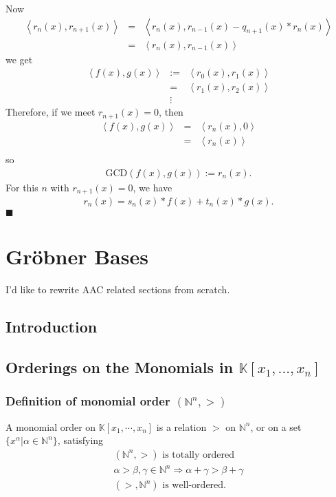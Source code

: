 \documentclass[11pt]{book}
\begin{document}
Now
\begin{eqnarray}
\left< r_n(x), r_{n+1}(x) \right>
&=& \left< r_n(x), r_{n-1}(x) - q_{n+1}(x) * r_n(x) \right> \\
&=& \left< r_n(x), r_{n-1}(x) \right>
\end{eqnarray}
we get
\begin{eqnarray}
\left< f(x), g(x) \right> &:=& \left< r_0(x), r_1(x) \right> \\
&=& \left< r_1(x), r_2(x) \right> \\
\nonumber &\vdots& 
\end{eqnarray}
Therefore, if we meet $r_{n+1}(x) = 0$, then
\begin{eqnarray}
\left< f(x), g(x) \right>  &=& \left< r_n(x), 0 \right> \\
&=& \left< r_n(x)\right> \\
\end{eqnarray}
so
\begin{eqnarray}
\text{GCD}\left( f(x), g(x) \right) := r_n(x).
\end{eqnarray}
For this $n$ with $r_{n+1}(x) = 0$, we have
\begin{eqnarray}
r_n(x) = s_n(x) * f(x) + t_n(x) * g(x).
\end{eqnarray}
$\blacksquare$


\chapter{Gr\"obner Bases}
I'd like to rewrite AAC related sections from scratch.

\section{Introduction}

\section{Orderings on the Monomials in $\mathbb{K}\left[x_1, ... , x_n\right]$}
\subsection{Definition of monomial order $(\mathbb{N}^n, >)$}
\label{DefOfMonomialOrder}
A monomial order on $\mathbb{K}[x_1, \cdots, x_n]$ is a relation $>$ on $\mathbb{N}^n$, or on a set $\{x^\alpha | \alpha \in \mathbb{N}^n \}$, satisfying
\begin{eqnarray}
\text{$(\mathbb{N}^n, >)$ is totally ordered} \\
\alpha > \beta, \gamma \in \mathbb{N}^n \Rightarrow \alpha + \gamma > \beta + \gamma \\
\label{wellOrderedMonomialOrder}
\text{$(>, \mathbb{N}^n)$ is well-ordered.}
\end{eqnarray}
\end{document}
